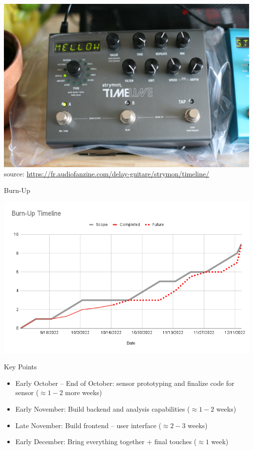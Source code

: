 \documentclass{beamer}
\begin{document}
  \begin{frame}{\sectitle}{}
    \begin{center}
      \includegraphics[scale=.07]{images/timeline.jpg}
      \tiny source: \url{https://fr.audiofanzine.com/delay-guitare/strymon/timeline/}
    \end{center}
  \end{frame}

  \begin{frame}{\sectitle}{Burn-Up}
    \begin{center}
      \includegraphics[scale=.4]{images/burn-up.png}
    \end{center}
  \end{frame}

  \begin{frame}{\sectitle}{Key Points}
    \begin{itemize}
      \item Early October -- End of October: sensor prototyping and finalize code for sensor ($\approx 1-2$ more weeks)
      \item Early November: Build backend and analysis capabilities ($\approx 1-2$ weeks)
      \item Late November: Build frontend -- user interface ($\approx 2-3$ weeks)
      \item Early December: Bring everything together + final touches ($\approx 1$ week)
    \end{itemize}
  \end{frame}
\end{document}
